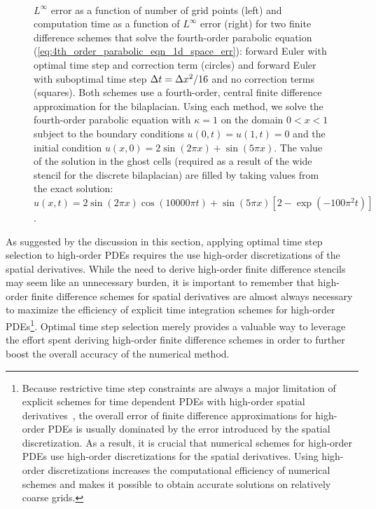 \documentclass[oneeqnum,onefignum,onetabnum,onethmnum]{siamltex}
\begin{document}
\begin{figure}[htb]
\begin{center}
\ \ 
\caption{$L^\infty$ error as a function of number of grid points (left)
and computation time as a function of $L^\infty$ error (right) for two 
finite difference schemes that solve the fourth-order parabolic equation 
(\ref{eq:4th_order_parabolic_eqn_1d_space_err}):
forward Euler with optimal time step and correction term (circles)
and forward Euler with suboptimal time step $\Delta t = \Delta x^2/16$ and no 
correction terms (squares).
Both schemes use a fourth-order, central finite difference approximation for
the bilaplacian.  Using each method, we solve the fourth-order parabolic
equation with $\kappa = 1$ on the domain $0 < x < 1$ subject to the boundary 
conditions $u(0,t) = u(1,t) = 0$ and the initial condition
$u(x,0) = 2\sin(2 \pi x) + \sin(5 \pi x)$.  The value of the solution
in the ghost cells (required as a result of the wide stencil for the 
discrete bilaplacian) are filled by taking values from the exact solution: 
$u(x,t) = 2\sin(2 \pi x)\cos(10000 \pi t) 
        + \sin(5 \pi x) \left[ 2-\exp(-100\pi^2 t) \right]$.
}
\label{fig:4th_order_parabolic_eqn_1d_error}
\end{center}
\end{figure}

As suggested by the discussion in this section, applying optimal time step 
selection to high-order PDEs requires the use high-order discretizations
of the spatial derivatives.  While the need to derive high-order finite 
difference stencils may seem like an unnecessary burden, it is important
to remember that high-order finite difference schemes for spatial derivatives
are almost always necessary to maximize the efficiency of explicit time
integration schemes for high-order PDEs\footnote{Because restrictive time 
step constraints are always a major limitation of explicit schemes for 
time dependent PDEs with high-order spatial 
derivatives~\cite{gko_book,greer_2006}, 
the overall error of finite difference approximations for high-order PDEs
is usually dominated by the error introduced by the spatial discretization.
As a result, it is crucial that numerical schemes for high-order PDEs use 
high-order discretizations for the spatial derivatives.  Using high-order 
discretizations increases the computational efficiency of numerical schemes 
and makes it possible to obtain accurate solutions on relatively coarse 
grids.}. 
Optimal time step selection merely provides a valuable way to leverage the 
effort spent deriving high-order finite difference schemes in order to further 
boost the overall accuracy of the numerical method.
\end{document}
